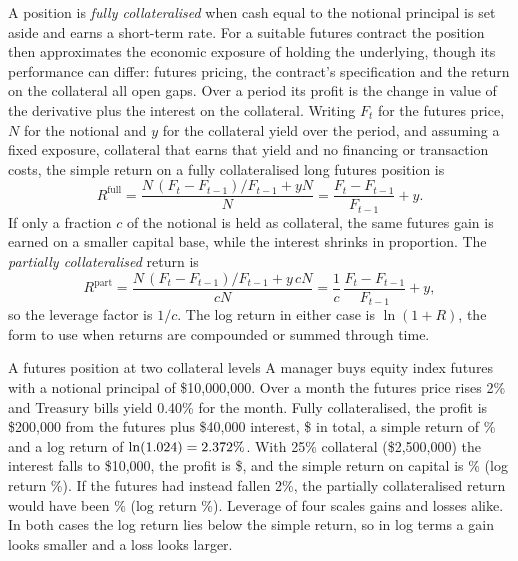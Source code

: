 \begin{chapterrefs}
A position is \emph{fully collateralised} when cash equal to the notional principal is set aside and
earns a short-term rate. For a suitable futures contract the position then approximates the economic exposure of holding the
underlying, though its performance can differ: futures pricing, the contract's specification and
the return on the collateral all open gaps. Over a period its profit is the change in value of the derivative plus the interest on
the collateral. Writing $F_t$ for the futures price, $N$ for the notional and $y$ for the
collateral yield over the period, and assuming a fixed exposure, collateral that earns that yield and no
financing or transaction costs, the simple return on a fully collateralised long futures position is
\begin{equation}\label{eq:fullcoll}
  R^{\text{full}} = \frac{N\,(F_t-F_{t-1})/F_{t-1} + yN}{N} = \frac{F_t-F_{t-1}}{F_{t-1}} + y .
\end{equation}
If only a fraction $c$ of the notional is held as collateral, the same futures gain is earned on a
smaller capital base, while the interest shrinks in proportion. The \emph{partially collateralised} return is
\begin{equation}\label{eq:partcoll}
  R^{\text{part}} = \frac{N\,(F_t-F_{t-1})/F_{t-1} + y\,cN}{cN}
  = \frac{1}{c}\,\frac{F_t-F_{t-1}}{F_{t-1}} + y ,
\end{equation}
so the leverage factor is $1/c$. The log return in either case is $\ln(1+R)$, the form to use when returns are compounded or summed
through time.

\begin{example}{A futures position at two collateral levels}\label{ex:notional}
A manager buys equity index futures with a notional principal of \$10{,}000{,}000. Over a month the
futures price rises 2\% and Treasury bills yield 0.40\% for the month. Fully collateralised, the profit
is \$200{,}000 from the futures plus \$40{,}000 interest, \$\pnlFull{} in total, a simple return of
\simpleFull\% and a log return of $\ln(1.024) = 2.372\%$. With 25\% collateral (\$2{,}500{,}000) the
interest falls to \$10{,}000, the profit is \$\pnlPart{}, and the simple return on capital is
\simplePart\% (log return \logPart\%). If the futures had instead fallen 2\%, the partially
collateralised return would have been \simplePartLoss\% (log return \logPartLoss\%). Leverage of four
scales gains and losses alike. In both cases the log return lies below the simple return, so in log
terms a gain looks smaller and a loss looks larger.
\end{example}


\end{chapterrefs}
